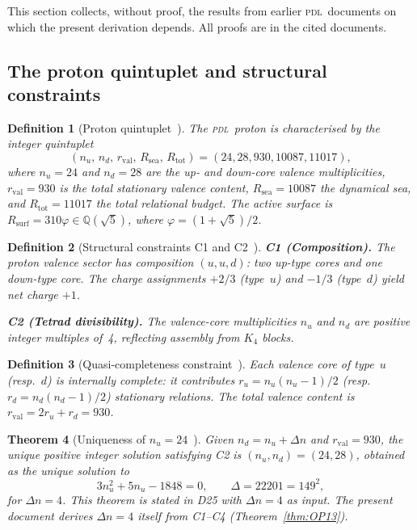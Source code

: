 \documentclass[12pt,a4paper]{article}
\newtheorem{theorem}{Theorem}[section]
\newtheorem{definition}[theorem]{Definition}
\newcommand{\Kfour}{K_4}
\newcommand{\PDL}{\textsc{pdl}}
\newcommand{\quintuplet}{(24,28,930,10087,11017)}
\newcommand{\nuu}{n_u}
\newcommand{\ndd}{n_d}
\newcommand{\Dn}{\Delta n}
\newcommand{\rval}{r_{\mathrm{val}}}
\newcommand{\Rsea}{R_{\mathrm{sea}}}
\newcommand{\Rtot}{R_{\mathrm{tot}}}
\newcommand{\Rsurf}{R_{\mathrm{surf}}}
\newcommand{\vp}{\varphi}
\begin{document}
This section collects, without proof, the results from earlier \PDL\ documents on which the present derivation depends. All proofs are in the cited documents.

\subsection{The proton quintuplet and structural constraints}

\begin{definition}[Proton quintuplet~{\cite{PDL_D16b_2026,PDL_D29_2026}}]
\label{def:quintuplet}
The \PDL\ proton is characterised by the integer quintuplet
\begin{equation}
(\nuu,\, \ndd,\, \rval,\, \Rsea,\, \Rtot) = \quintuplet,
\end{equation}
where $\nuu = 24$ and $\ndd = 28$ are the up- and down-core valence multiplicities, $\rval = 930$ is the total stationary valence content, $\Rsea = 10087$ the dynamical sea, and $\Rtot = 11017$ the total relational budget. The active surface is $\Rsurf = 310\vp \in \mathbb{Q}(\sqrt{5})$, where $\vp = (1+\sqrt{5})/2$.
\end{definition}

\begin{definition}[Structural constraints C1 and C2~{\cite{PDL_D16b_2026}}]
\label{def:C1C2}
\textbf{C1 (Composition).} The proton valence sector has composition $(u,u,d)$: two up-type cores and one down-type core. The charge assignments $+2/3$ (type~$u$) and $-1/3$ (type~$d$) yield net charge $+1$.

\textbf{C2 (Tetrad divisibility).} The valence-core multiplicities $\nuu$ and $\ndd$ are positive integer multiples of~4, reflecting assembly from $\Kfour$ blocks.
\end{definition}

\begin{definition}[Quasi-completeness constraint~{\cite{PDL_D25_2026}}]
\label{def:quasicompleteness}
Each valence core of type~$u$ (resp.~$d$) is internally complete: it contributes $r_u = \nuu(\nuu-1)/2$ (resp.\ $r_d = \ndd(\ndd-1)/2$) stationary relations. The total valence content is $\rval = 2r_u + r_d = 930$.
\end{definition}

\begin{theorem}[Uniqueness of $\nuu = 24$~{\cite{PDL_D25_2026}}]
\label{thm:nu24}
Given $\ndd = \nuu + \Dn$ and $\rval = 930$, the unique positive integer solution satisfying C2 is $(\nuu, \ndd) = (24, 28)$, obtained as the unique solution to
\begin{equation}
3\nuu^2 + 5\nuu - 1848 = 0, \qquad \Delta = 22201 = 149^2,
\label{eq:quadratic_Dn4}
\end{equation}
for $\Dn = 4$. This theorem is stated in D25 with $\Dn = 4$ as input. The present document derives $\Dn = 4$ itself from C1--C4 (Theorem~\ref{thm:OP13}).
\end{theorem}
\end{document}
